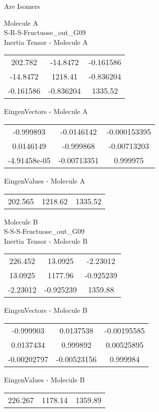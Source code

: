 \begin{center}
\vtab
\vtab
\textcolor{NavyBlue}{\Large Are Isomers}
\end{center}
\newpage
\begin{multicols}{2}
\begin{center}
Molecule A \\ 
S-R-S-Fructuose\_out\_G09
\\
Inertia Tensor - Molecule A \\
\vtab
\begin{tabular}{|c c c|}
202.782	 & 	-14.8472	 & 	-0.161586	 \\
-14.8472	 & 	1218.41	 & 	-0.836204	 \\
-0.161586	 & 	-0.836204	 & 	1335.52
\end{tabular}

\vtab
 EingenVectors - Molecule A     \\
\vtab
\begin{tabular}{|c c c|}
-0.999893	 & 	-0.0146142	 & 	-0.000153395	 \\
0.0146149	 & 	-0.999868	 & 	-0.00713203	 \\
-4.91458e-05	 & 	-0.00713351	 & 	0.999975
\end{tabular}

\vtab
 EingenValues - Molecule A     \\
\vtab
\begin{tabular}{|c c c|}
202.565	 & 	1218.62	 & 	1335.52
\end{tabular}
\columnbreak

Molecule B \\ 
S-S-S-Fructuose\_out\_G09
\\
Inertia Tensor - Molecule B \\
\vtab
\begin{tabular}{|c c c|}
226.452	 & 	13.0925	 & 	-2.23012	 \\
13.0925	 & 	1177.96	 & 	-0.925239	 \\
-2.23012	 & 	-0.925239	 & 	1359.88
\end{tabular}

\vtab
 EingenVectors - Molecule B     \\
\vtab
\begin{tabular}{|c c c|}
-0.999903	 & 	0.0137538	 & 	-0.00195585	 \\
0.0137434	 & 	0.999892	 & 	0.00525895	 \\
-0.00202797	 & 	-0.00523156	 & 	0.999984
\end{tabular}

\vtab
 EingenValues - Molecule B     \\
\vtab
\begin{tabular}{|c c c|}
226.267	 & 	1178.14	 & 	1359.89
\end{tabular}

\end{center}
\end{multicols}
